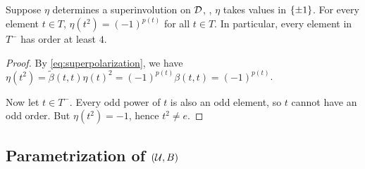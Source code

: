 
\begin{cor}\label{cor:eta-t-square}
    Suppose $\eta$ determines a superinvolution on $\mathcal{D}$, \ie, $\eta$ takes values in $\{ \pm 1 \}$. 
    For every element $t\in T$, $\eta(t^2) = (-1)^{p(t)}$ for all $t\in T$. 
    In particular, every element in $T^-$ has order at least $4$. 
\end{cor}

\begin{proof}
    By \cref{eq:superpolarization}, we have $\eta (t^2) = \tilde\beta(t,t) \eta(t)^2 = (-1)^{p(t)} \beta(t,t) = (-1)^{p(t)}$. 
    
    Now let $t\in T^-$.
	Every odd power of $t$ is also an odd element, so $t$ cannot have an odd order.
	But $\eta (t^2) = -1$, hence $t^2 \neq e$. 
\end{proof}




\subsection{Parametrization of \texorpdfstring{$(\mathcal U, B)$}{(U, B)}}



